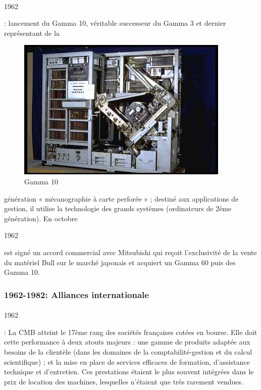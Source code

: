 \documentclass{article}
\begin{document}
		\paragraph{}
		\begin{bf}1962\end{bf}: lancement du Gamma 10, véritable successeur du Gamma 3 et dernier représentant de la 
		\begin{figure}
		\includegraphics[scale=0.25]{gamma10.jpg}
		\caption{Gamma 10}
		\end{figure}
		génération « mécanographie à carte perforée » ; destiné aux applications de gestion, il utilise la technologie des 
		grands systèmes (ordinateurs de 2ème génération). En octobre \begin{bf}1962\end{bf} est signé un accord commercial 
		avec Mitsubishi qui reçoit l'exclusivité de la vente du matériel Bull sur le marché japonais et acquiert  un Gamma 60 
		puis des Gamma 10.
		\newline{}
		\newline{}
		\newline{}
		\newline{}
		\subsubsection{1962-1982: Alliances internationale}
		\paragraph{}
		\begin{bf}1962\end{bf}: La CMB atteint le 17ème rang des sociétés françaises cotées en bourse. Elle doit cette 
		performance à deux atouts majeurs : une gamme de produits adaptée aux besoins de la clientèle (dans les domaines de la 
		comptabilité-gestion et du calcul scientifique) ; et la mise en place de services efficaces de formation, d’assistance 
		technique et d’entretien. Ces prestations étaient le plus souvent intégrées dans le prix de location des machines, 
		lesquelles n’étaient que très rarement vendues.
\end{document}
